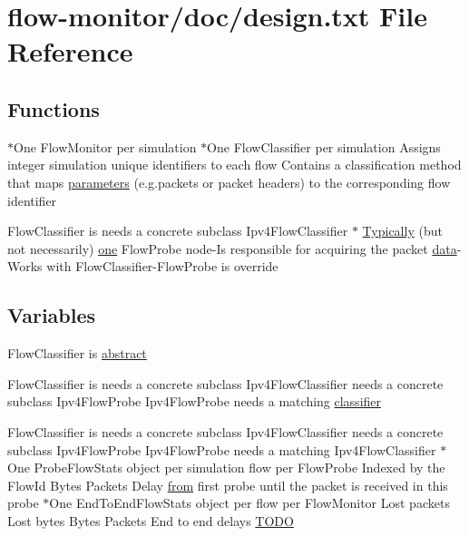 \hypertarget{design_8txt}{}\section{flow-\/monitor/doc/design.txt File Reference}
\label{design_8txt}
\subsection*{Functions}
\begin{DoxyCompactItemize}
\item 
$\ast$One Flow\+Monitor per simulation $\ast$One Flow\+Classifier per simulation Assigns integer simulation unique identifiers to each flow Contains a classification method that maps \hyperlink{design_8txt_a61257d1df1c87e8bd4ba94cacb4982cf}{parameters} (e.\+g.\+packets or packet headers) to the corresponding flow identifier
\item 
Flow\+Classifier is needs a concrete subclass Ipv4\+Flow\+Classifier $\ast$ \hyperlink{design_8txt_a9bd37ccd5f36d9958cc7ea535f6ba785}{Typically} (but not necessarily) \hyperlink{visualizer-ideas_8txt_a0a84c3fa82a58d60404416317320714e}{one} Flow\+Probe node-\/Is responsible for acquiring the packet \hyperlink{topology-example-sim_8cc_a26c65296e316af77b787dc77469bb2a4}{data}-\/Works with Flow\+Classifier-\/Flow\+Probe is override
\end{DoxyCompactItemize}
\subsection*{Variables}
\begin{DoxyCompactItemize}
\item 
Flow\+Classifier is \hyperlink{design_8txt_af450f1fe0c19a5495b395272ca520ff9}{abstract}
\item 
Flow\+Classifier is needs a concrete subclass Ipv4\+Flow\+Classifier needs a concrete subclass Ipv4\+Flow\+Probe Ipv4\+Flow\+Probe needs a matching \hyperlink{design_8txt_af9e6b398b148789960232a87c72a107e}{classifier}
\item 
Flow\+Classifier is needs a concrete subclass Ipv4\+Flow\+Classifier needs a concrete subclass Ipv4\+Flow\+Probe Ipv4\+Flow\+Probe needs a matching Ipv4\+Flow\+Classifier $\ast$One Probe\+Flow\+Stats object per simulation flow per Flow\+Probe Indexed by the Flow\+Id Bytes Packets Delay \hyperlink{lte__amc_8m_a1b4c81ff74eb1a626b5ade44c81004b3}{from} first probe until the packet is received in this probe $\ast$One End\+To\+End\+Flow\+Stats object per flow per Flow\+Monitor Lost packets Lost bytes Bytes Packets End to end delays \hyperlink{design_8txt_acac571e7916a3fa404f97966c2235936}{T\+O\+DO}
\end{DoxyCompactItemize}


